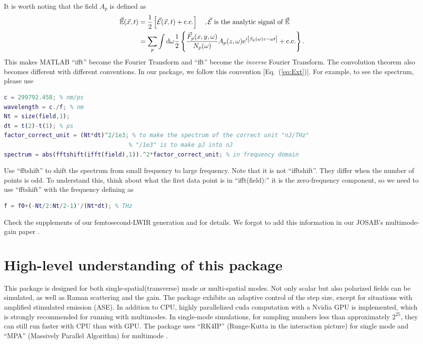 \documentclass[12pt,hidelinks]{book}
\begin{document}
It is worth noting that the field $A_p$ is defined as
\begin{align}
\vec{\mathbb{E}}(\vec{x},t) & =\frac{1}{2}\left[\vec{\mathcal{E}}(\vec{x},t)+\text{c.c.}\right]\quad,\vec{\mathcal{E}}\text{ is the analytic signal of }\vec{\mathbb{E}} \nonumber \\
& =\sum_p\int\mathop{}\!\mathrm{d}\omega\frac{1}{2}\left\{\frac{\vec{F}_p(x,y,\omega)}{N_p(\omega)}A_p(z,\omega)\mathrm{e}^{i\left[\beta_p(\omega)z-\omega t\right]}+\text{c.c.}\right\}.
\label{eq:Ext}
\end{align}
This makes MATLAB ``ifft'' become the Fourier Transform and ``fft'' become the \emph{inverse} Fourier Transform. The convolution theorem also becomes different with different conventions. In our package, we follow this convention [Eq.~(\ref{eq:Ext})]. For example, to see the spectrum, please use
\begin{lstlisting}[language=MATLAB]
c = 299792.458; % nm/ps
wavelength = c./f; % nm
Nt = size(field,1);
dt = t(2)-t(1); % ps
factor_correct_unit = (Nt*dt)^2/1e3; % to make the spectrum of the correct unit "nJ/THz"
                                    % "/1e3" is to make pJ into nJ
spectrum = abs(fftshift(ifft(field),1)).^2*factor_correct_unit; % in frequency domain
\end{lstlisting}
Use ``fftshift'' to shift the spectrum from small frequency to large frequency. Note that it is not ``ifftshift''. They differ when the number of points is odd. To understand this, think about what the first data point is in ``ifft(field):'' it is the zero-frequency component, so we need to use ``fftshift'' with the frequency defining as
\begin{lstlisting}[language=MATLAB]
f = f0+(-Nt/2:Nt/2-1)'/(Nt*dt); % THz
\end{lstlisting}

Check the supplements of our femtosecond-LWIR generation \cite{Chen2023} and \cite{Chen2024} for details. We forgot to add this information in our JOSAB's multimode-gain paper \cite{Chen2023a}.

\section{High-level understanding of this package}
This package is designed for both single-spatial(transverse) mode or multi-spatial modes. Not only scalar but also polarized fields can be simulated, as well as Raman scattering and the gain. The package exhibits an adaptive control of the step size, except for situations with amplified stimulated emission (ASE). In addition to CPU, highly parallelized cuda computation with a Nvidia GPU is implemented, which is strongly recommended for running with multimodes. In single-mode simulations, for sampling numbers less than approximately $2^{25}$, they can still run faster with CPU than with GPU. The package uses ``RK4IP'' (Runge-Kutta in the interaction picture) for single mode \cite{Heidt2009,Balac2013} and ``MPA'' (Massively Parallel Algorithm) for multimode \cite{Wright2018}.
\end{document}
